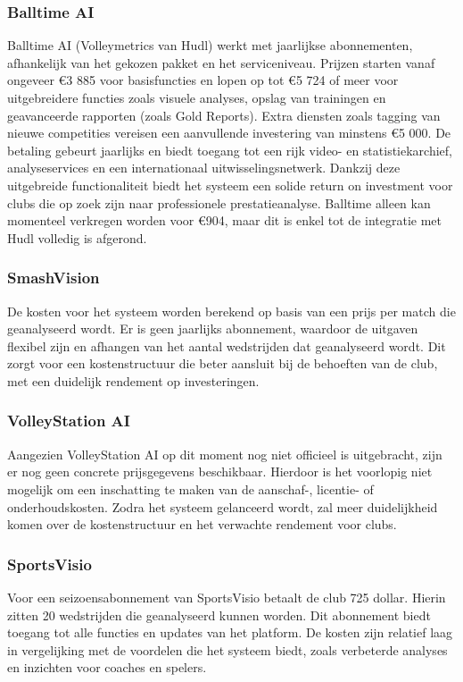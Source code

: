 \subsubsection{Balltime AI}
Balltime AI (Volleymetrics van Hudl) werkt met jaarlijkse abonnementen, afhankelijk van het gekozen pakket en het serviceniveau. Prijzen starten vanaf ongeveer €3 885 voor basisfuncties en lopen op tot €5 724 of meer voor uitgebreidere functies zoals visuele analyses, opslag van trainingen en geavanceerde rapporten (zoals Gold Reports). Extra diensten zoals tagging van nieuwe competities vereisen een aanvullende investering van minstens €5 000. De betaling gebeurt jaarlijks en biedt toegang tot een rijk video- en statistiekarchief, analyseservices en een internationaal uitwisselingsnetwerk. Dankzij deze uitgebreide functionaliteit biedt het systeem een solide return on investment voor clubs die op zoek zijn naar professionele prestatieanalyse. Balltime alleen kan momenteel verkregen worden voor €904, maar dit is enkel tot de integratie met Hudl volledig is afgerond. \autocite{Shenton2025}
\subsubsection{SmashVision}
De kosten voor het systeem worden berekend op basis van een prijs per match die geanalyseerd wordt. Er is geen jaarlijks abonnement, waardoor de uitgaven flexibel zijn en afhangen van het aantal wedstrijden dat geanalyseerd wordt. Dit zorgt voor een kostenstructuur die beter aansluit bij de behoeften van de club, met een duidelijk rendement op investeringen. \autocite{Doren2025}
\subsubsection{VolleyStation AI}
Aangezien VolleyStation AI op dit moment nog niet officieel is uitgebracht, zijn er nog geen concrete prijsgegevens beschikbaar. Hierdoor is het voorlopig niet mogelijk om een inschatting te maken van de aanschaf-, licentie- of onderhoudskosten. Zodra het systeem gelanceerd wordt, zal meer duidelijkheid komen over de kostenstructuur en het verwachte rendement voor clubs. \autocite{VolleyStationAI2025}
\subsubsection{SportsVisio}
Voor een seizoensabonnement van SportsVisio betaalt de club 725 dollar. Hierin zitten 20 wedstrijden die geanalyseerd kunnen worden. Dit abonnement biedt toegang tot alle functies en updates van het platform. De kosten zijn relatief laag in vergelijking met de voordelen die het systeem biedt, zoals verbeterde analyses en inzichten voor coaches en spelers.\autocite{SportsVisio2025}

